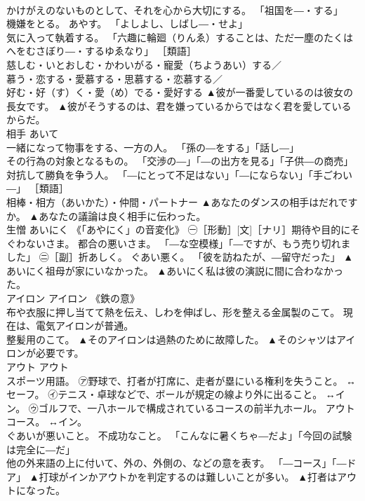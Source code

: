 \documentclass[8pt]{extreport}
\begin{document}
\begin{CJK}{UTF8}{min}
\\	かけがえのないものとして、それを心から大切にする。 「祖国を―・する」 
\\	機嫌をとる。 あやす。 「よしよし、しばし―・せよ」 
\\	気に入って執着する。 「六趣に輪廻（りんゑ）することは、ただ一塵のたくはへをむさぼり―・するゆゑなり」 ［類語］
\\	慈しむ・いとおしむ・かわいがる・寵愛（ちようあい）する／
\\	慕う・恋する・愛慕する・思慕する・恋慕する／
\\	好む・好（す）く・愛（め）でる・愛好する	▲彼が一番愛しているのは彼女の長女です。 ▲彼がそうするのは、君を嫌っているからではなく君を愛しているからだ。
\\	相手	あいて	
\\	一緒になって物事をする、一方の人。 「孫の―をする」「話し―」 
\\	その行為の対象となるもの。 「交渉の―」「―の出方を見る」「子供―の商売」 
\\	対抗して勝負を争う人。 「―にとって不足はない」「―にならない」「手ごわい―」 ［類語］
\\	相棒・相方（あいかた）・仲間・パートナー	▲あなたのダンスの相手はだれですか。 ▲あなたの議論は良く相手に伝わった。
\\	生憎	あいにく	《「あやにく」の音変化》 ㊀［形動］[文]［ナリ］期待や目的にそぐわないさま。 都合の悪いさま。 「―な空模様」「―ですが、もう売り切れました」 ㊁［副］折あしく。 ぐあい悪く。 「彼を訪ねたが、―留守だった」	▲あいにく祖母が家にいなかった。 ▲あいにく私は彼の演説に間に合わなかった。
\\	アイロン	アイロン	《鉄の意》 
\\	布や衣服に押し当てて熱を伝え、しわを伸ばし、形を整える金属製のこて。 現在は、電気アイロンが普通。 
\\	整髪用のこて。	▲そのアイロンは過熱のために故障した。 ▲そのシャツはアイロンが必要です。
\\	アウト	アウト	
\\	スポーツ用語。 ㋐野球で、打者が打席に、走者が塁にいる権利を失うこと。 ↔セーフ。 ㋑テニス・卓球などで、ボールが規定の線より外に出ること。 ↔イン。 ㋒ゴルフで、一八ホールで構成されているコースの前半九ホール。 アウトコース。 ↔イン。 
\\	ぐあいが悪いこと。 不成功なこと。 「こんなに暑くちゃ―だよ」「今回の試験は完全に―だ」 
\\	他の外来語の上に付いて、外の、外側の、などの意を表す。 「―コース」「―ドア」	▲打球がインかアウトかを判定するのは難しいことが多い。 ▲打者はアウトになった。

\end{CJK}
\end{document}
